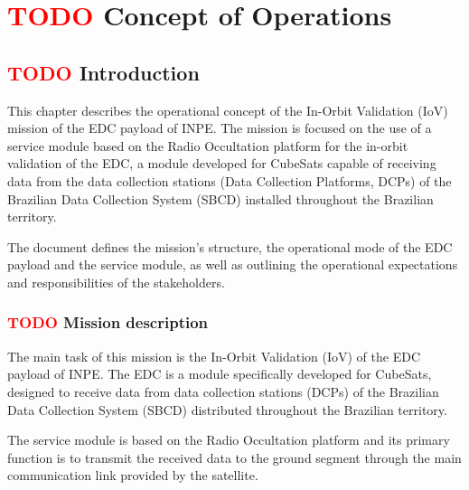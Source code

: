 %
%
%
%
%

%
%
%
%
%

\chapter{ \textcolor{red}{TODO} Concept of Operations} \label{ch:conops}

\section{ \textcolor{red}{TODO} Introduction}

This chapter describes the operational concept of the In-Orbit Validation (IoV) mission of the EDC payload of INPE. The mission is focused on the use of a service module based on the Radio Occultation platform for the in-orbit validation of the EDC, a module developed for CubeSats capable of receiving data from the data collection stations (Data Collection Platforms, DCPs) of the Brazilian Data Collection System (SBCD) installed throughout the Brazilian territory.

The document defines the mission's structure, the operational mode of the EDC payload and the service module, as well as outlining the operational expectations and responsibilities of the stakeholders.

\subsection{ \textcolor{red}{TODO} Mission description}

The main task of this mission is the In-Orbit Validation (IoV) of the EDC payload of INPE. The EDC is a module specifically developed for CubeSats, designed to receive data from data collection stations (DCPs) of the Brazilian Data Collection System (SBCD) distributed throughout the Brazilian territory.

The service module is based on the Radio Occultation platform and its primary function is to transmit the received data to the ground segment through the main communication link provided by the satellite.

